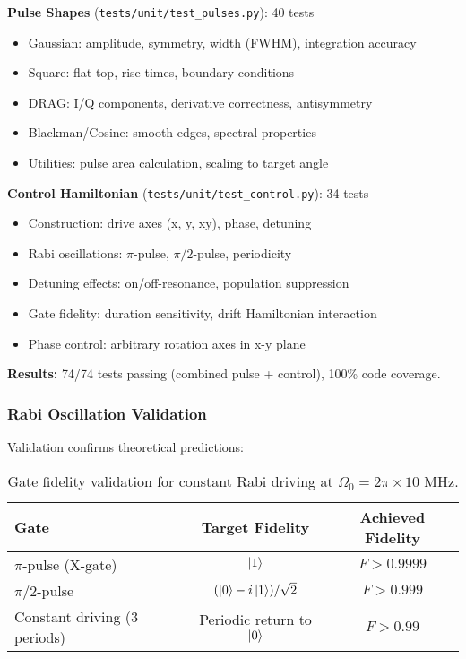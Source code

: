 \documentclass[11pt,a4paper]{article}
\theoremstyle{definition}
\theoremstyle{remark}
\begin{document}
\textbf{Pulse Shapes} (\texttt{tests/unit/test\_pulses.py}): 40 tests
\begin{itemize}
    \item Gaussian: amplitude, symmetry, width (FWHM), integration accuracy
    \item Square: flat-top, rise times, boundary conditions
    \item DRAG: I/Q components, derivative correctness, antisymmetry
    \item Blackman/Cosine: smooth edges, spectral properties
    \item Utilities: pulse area calculation, scaling to target angle
\end{itemize}

\textbf{Control Hamiltonian} (\texttt{tests/unit/test\_control.py}): 34 tests
\begin{itemize}
    \item Construction: drive axes (x, y, xy), phase, detuning
    \item Rabi oscillations: $\pi$-pulse, $\pi/2$-pulse, periodicity
    \item Detuning effects: on/off-resonance, population suppression
    \item Gate fidelity: duration sensitivity, drift Hamiltonian interaction
    \item Phase control: arbitrary rotation axes in x-y plane
\end{itemize}

\textbf{Results:} 74/74 tests passing (combined pulse + control), 100\% code coverage.

\subsubsection{Rabi Oscillation Validation}

Validation confirms theoretical predictions:

\begin{table}[h]
\centering
\begin{tabular}{@{}lcc@{}}
\toprule
\textbf{Gate} & \textbf{Target Fidelity} & \textbf{Achieved Fidelity} \\
\midrule
$\pi$-pulse (X-gate) & $\ket{1}$ & $F > 0.9999$ \\
$\pi/2$-pulse & $({\ket{0} - i\ket{1}})/\sqrt{2}$ & $F > 0.999$ \\
Constant driving (3 periods) & Periodic return to $\ket{0}$ & $F > 0.99$ \\
\bottomrule
\end{tabular}
\caption{Gate fidelity validation for constant Rabi driving at $\Omega_0 = 2\pi \times 10$ MHz.}
\end{table}
\end{document}
